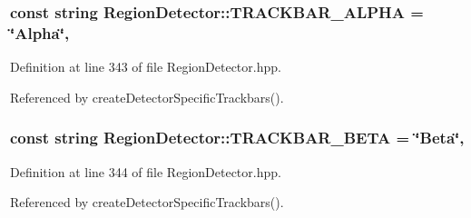 \hypertarget{classmultiscale_1_1analysis_1_1RegionDetector_a5513e029d4d4cf249aa40364489f7a85}{
\subsubsection[{T\-R\-A\-C\-K\-B\-A\-R\-\_\-\-A\-L\-P\-H\-A}]{\setlength{\rightskip}{0pt plus 5cm}const string Region\-Detector\-::\-T\-R\-A\-C\-K\-B\-A\-R\-\_\-\-A\-L\-P\-H\-A = \char`\"{}Alpha\char`\"{}\hspace{0.3cm}{\ttfamily [static]}, {\ttfamily [private]}}}\label{classmultiscale_1_1analysis_1_1RegionDetector_a5513e029d4d4cf249aa40364489f7a85}


Definition at line 343 of file Region\-Detector.\-hpp.



Referenced by create\-Detector\-Specific\-Trackbars().

\hypertarget{classmultiscale_1_1analysis_1_1RegionDetector_a79d7878ed55bf12a87637896a1f44e37}{
\subsubsection[{T\-R\-A\-C\-K\-B\-A\-R\-\_\-\-B\-E\-T\-A}]{\setlength{\rightskip}{0pt plus 5cm}const string Region\-Detector\-::\-T\-R\-A\-C\-K\-B\-A\-R\-\_\-\-B\-E\-T\-A = \char`\"{}Beta\char`\"{}\hspace{0.3cm}{\ttfamily [static]}, {\ttfamily [private]}}}\label{classmultiscale_1_1analysis_1_1RegionDetector_a79d7878ed55bf12a87637896a1f44e37}


Definition at line 344 of file Region\-Detector.\-hpp.



Referenced by create\-Detector\-Specific\-Trackbars().

